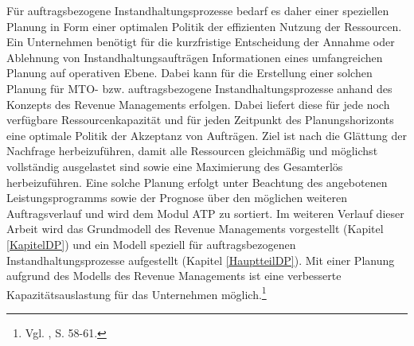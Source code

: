 Für auftragsbezogene Instandhaltungsprozesse bedarf es daher einer speziellen Planung in Form einer optimalen Politik der effizienten Nutzung der Ressourcen. Ein Unternehmen benötigt für die kurzfristige Entscheidung der Annahme oder Ablehnung von Instandhaltungsaufträgen Informationen eines umfangreichen Planung auf operativen Ebene. Dabei kann für die Erstellung einer solchen Planung für MTO- bzw. auftragsbezogene Instandhaltungsprozesse anhand des Konzepts des Revenue Managements erfolgen. Dabei liefert diese für jede noch verfügbare Ressourcenkapazität und für jeden Zeitpunkt des Planungshorizonts eine optimale Politik der Akzeptanz von Aufträgen. Ziel ist nach \cite{Petrick:2009aa} die Glättung der Nachfrage herbeizuführen, damit alle Ressourcen gleichmäßig und möglichst vollständig ausgelastet sind sowie eine Maximierung des Gesamterlös herbeizuführen. Eine solche Planung erfolgt unter Beachtung des angebotenen Leistungsprogramms sowie der Prognose über den möglichen weiteren Auftragsverlauf und wird dem Modul ATP zu sortiert.  Im weiteren Verlauf dieser Arbeit wird das Grundmodell des Revenue Managements vorgestellt (Kapitel \ref{KapitelDP}) und ein Modell speziell für auftragsbezogenen Instandhaltungsprozesse aufgestellt (Kapitel \ref{HauptteilDP}). Mit einer Planung aufgrund des Modells des Revenue Managements ist eine verbesserte Kapazitätsauslastung für das Unternehmen möglich.\footnote{Vgl. \cite{Petrick:2009aa}, S. 58-61.}





